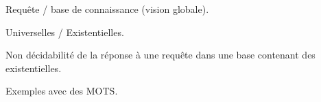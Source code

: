 
Requête / base de connaissance (vision globale).

Universelles / Existentielles.

Non décidabilité de la réponse à une requête dans une base contenant des existentielles.

Exemples avec des MOTS.

